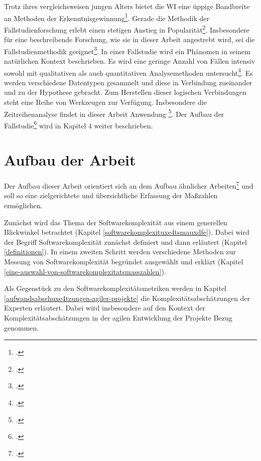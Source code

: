 Trotz ihres vergleichsweisen jungen Alters bietet die \ac{WI} eine üppige
Bandbreite an Methoden der Erkenntnisgewinnung\footcite[Vgl. ][S. 113]{heinrichForschungsmethodikIntegrationsdisziplinBeitrag2005}. Gerade die Methodik der Fallstudienforschung erlebt einen
stetigen Anstieg in Popularität\footcite[Vgl. ][S. 22]{yinCaseStudyResearch2014}. Insbesondere für eine beschreibende
Forschung, wie sie in dieser Arbeit angestrebt wird, sei die
Fallstudienmethodik geeignet\footcite[Vgl. ][S. 607]{dubeRigorInformationSystems2003}. In einer Fallstudie wird ein Phänomen in seinem natürlichen
Kontext beschrieben. Es wird eine geringe Anzahl von Fällen intensiv
sowohl mit qualitativen als auch quantitativen Analysemethoden
untersucht\footcite[Vgl. ][S. 7]{gothlichFallstudienAlsForschungsmethode2003}.
Es werden verschiedene Datentypen gesammelt und diese in Verbindung
zueinander und zu der Hypothese gebracht. Zum Herstellen dieser
logischen Verbindungen steht eine Reihe von Werkzeugen zur Verfügung.
Insbesondere die Zeitreihenanalyse findet in dieser Arbeit Anwendung
\footcite[Vgl. ][S. 6]{gothlichFallstudienAlsForschungsmethode2003}. Der Aufbau
der Fallstudie\footcite[Vgl. ][S.
8ff]{gothlichFallstudienAlsForschungsmethode2003} wird in Kapitel 4 weiter beschrieben.

\section{Aufbau der Arbeit}\label{aufbau-der-arbeit}

Der Aufbau dieser Arbeit orientiert sich an dem Aufbau ähnlicher
Arbeiten\footcite[Vgl. ][S. 260]{aleneziEmpiricalAnalysisComplexity2015} und soll so eine zielgerichtete und
übersichtliche Erfassung der Maßzahlen ermöglichen.

Zunächst wird das Thema der Softwarekomplexität aus einem generellen
Blickwinkel betrachtet (Kapitel \ref{softwarekomplexituxe4tsmauxdfe}). Dabei wird der Begriff
Softwarekomplexität zunächst definiert und dann erläutert (Kapitel \ref{definitionen}). In einem zweiten Schritt werden verschiedene Methoden zur
Messung von Softwarekomplexität begründet ausgewählt und erklärt
(Kapitel \ref{eine-auswahl-von-softwarekomplexitatsmasszahlen}).

Als Gegenstück zu den Softwarekomplexitätsmetriken werden in Kapitel \ref{aufwandsabschuxe4tzungen-agiler-projekte}
die Komplexitätsabschätzungen der Experten erläutert. Dabei wird
insbesondere auf den Kontext der Komplexitätsabschätzungen in der agilen
Entwicklung der Projekte Bezug genommen.

